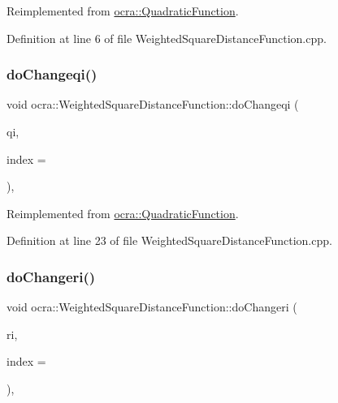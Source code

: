 Reimplemented from \hyperlink{classocra_1_1QuadraticFunction_a30d2c2217918164d24aaeadde5698d03}{ocra\+::\+Quadratic\+Function}.



Definition at line 6 of file Weighted\+Square\+Distance\+Function.\+cpp.

\hypertarget{classocra_1_1WeightedSquareDistanceFunction_a0ba9644814cf959e34ffc581a6b1e37a}{}\label{classocra_1_1WeightedSquareDistanceFunction_a0ba9644814cf959e34ffc581a6b1e37a} 
\subsubsection{\texorpdfstring{do\+Changeqi()}{doChangeqi()}}
{\footnotesize\ttfamily void ocra\+::\+Weighted\+Square\+Distance\+Function\+::do\+Changeqi (\begin{DoxyParamCaption}\item[{const Vector\+Xd \&}]{qi,  }\item[{int}]{index = {} }\end{DoxyParamCaption})\hspace{0.3cm}{\ttfamily [protected]}, {\ttfamily [virtual]}}



Reimplemented from \hyperlink{classocra_1_1QuadraticFunction_abced87346b20e5ed323b966626487f16}{ocra\+::\+Quadratic\+Function}.



Definition at line 23 of file Weighted\+Square\+Distance\+Function.\+cpp.

\hypertarget{classocra_1_1WeightedSquareDistanceFunction_afd6f2e03701395eed4db1b72588562ed}{}\label{classocra_1_1WeightedSquareDistanceFunction_afd6f2e03701395eed4db1b72588562ed} 
\subsubsection{\texorpdfstring{do\+Changeri()}{doChangeri()}}
{\footnotesize\ttfamily void ocra\+::\+Weighted\+Square\+Distance\+Function\+::do\+Changeri (\begin{DoxyParamCaption}\item[{double}]{ri,  }\item[{int}]{index = {} }\end{DoxyParamCaption})\hspace{0.3cm}{\ttfamily [protected]}, {\ttfamily [virtual]}}



